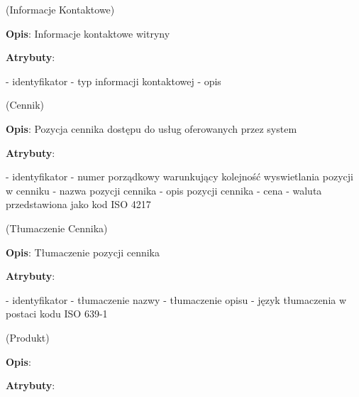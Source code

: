 \begin{enumerate}[label={\textbf{KAT/\protect\threedigits{\theenumi}}}, wide, labelwidth=!, labelindent=0pt, labelsep=0pt, series=reqs]
     \label{kat:ContactInfo} (Informacje Kontaktowe)

    \textbf{Opis}: Informacje kontaktowe witryny
    \par
    \textbf{Atrybuty}:
    \begin{itemize}[series=atr, wide, align=left, leftmargin=5cm]
         \label{kat:ContactInfo:id} - identyfikator
         \label{kat:ContactInfo:contactInfoType} - typ informacji kontaktowej
         \label{kat:ContactInfo:description} - opis
    \end{itemize}

     \label{kat:Pricing} (Cennik)

    \textbf{Opis}: Pozycja cennika dostępu do usług oferowanych przez system
    \par
    \textbf{Atrybuty}:
    \begin{itemize}[series=atr, wide, align=left, leftmargin=5cm]
         \label{kat:Pricing:id} - identyfikator
         \label{kat:Pricing:ordinalNumber} - numer porządkowy warunkujący kolejność wyswietlania pozycji w cenniku
         \label{kat:Pricing:title} - nazwa pozycji cennika
         \label{kat:Pricing:description} - opis pozycji cennika
         \label{kat:Pricing:price} - cena
         \label{kat:Pricing:currency} - waluta przedstawiona jako kod ISO 4217
    \end{itemize}

     \label{kat:PricingTranslation} (Tłumaczenie Cennika)

    \textbf{Opis}: Tłumaczenie pozycji cennika
    \par
    \textbf{Atrybuty}:
    \begin{itemize}[series=atr, wide, align=left, leftmargin=5cm]
         \label{kat:PricingTranslation:id} - identyfikator
         \label{kat:PricingTranslation:title} - tłumaczenie nazwy
         \label{kat:PricingTranslation:description} - tłumaczenie opisu
         \label{kat:PricingTranslation:language} - język tłumaczenia w postaci kodu ISO 639-1
    \end{itemize}

     \label{kat:Product} (Produkt)

    \textbf{Opis}: \lipsum[1]
    \par
    \textbf{Atrybuty}:
    \begin{itemize}[series=atr, wide, align=left, leftmargin=5cm]
         \label{kat:Product:id}
         \label{kat:Product:source}
         \label{kat:Product:isPublic}
         \label{kat:Product:language}
    \end{itemize}


\end{enumerate}
